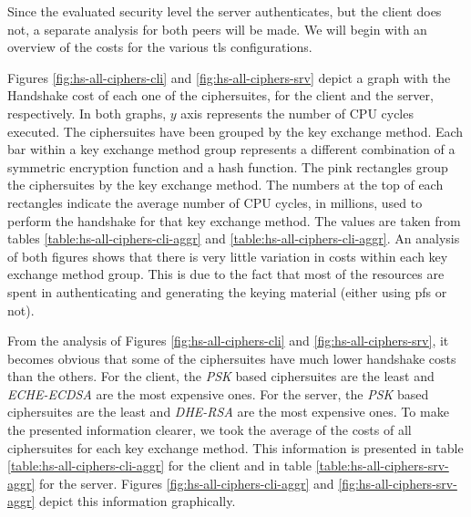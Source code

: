 \documentclass{llncs}
\begin{document}
Since the evaluated security level the server authenticates, but the client does not,
a separate analysis for both peers will be made. We will begin with an overview of the costs for the various \gls{tls}
configurations.

Figures \ref{fig:hs-all-ciphers-cli} and \ref{fig:hs-all-ciphers-srv} depict a graph with the Handshake cost of each one
of the ciphersuites, for the client and the server, respectively. In both graphs, $y$ axis represents the number of
CPU cycles executed. The ciphersuites have been grouped by the key exchange method. Each bar within a key
exchange method group represents a different combination of a symmetric encryption function and a hash function.
The pink rectangles group the ciphersuites by the key exchange method. The numbers at the top of each rectangles indicate the average
number of CPU  cycles, in millions, used to perform the handshake for that key exchange method. The values are taken
from tables \ref{table:hs-all-ciphers-cli-aggr} and \ref{table:hs-all-ciphers-cli-aggr}.
An analysis of both figures shows that there is very little variation in costs within
each key exchange method group. This is due to the fact that most of the resources are spent in authenticating and
generating the keying material (either using \gls{pfs} or not).

From the analysis of Figures \ref{fig:hs-all-ciphers-cli} and \ref{fig:hs-all-ciphers-srv}, it becomes obvious
that some of the ciphersuites have  much lower handshake costs than the others. For the client, the \textit{PSK} based
ciphersuites are the least and \textit{ECHE-ECDSA} are the most expensive ones. For the server, the \textit{PSK} based
ciphersuites are the least and \textit{DHE-RSA} are the most expensive ones. To make the presented information clearer,
we took the average of the costs of all ciphersuites for each key exchange method. This information is presented in
table \ref{table:hs-all-ciphers-cli-aggr} for the client and in table \ref{table:hs-all-ciphers-srv-aggr} for the server.
Figures \ref{fig:hs-all-ciphers-cli-aggr} and \ref{fig:hs-all-ciphers-srv-aggr} depict this information graphically.
\end{document}
